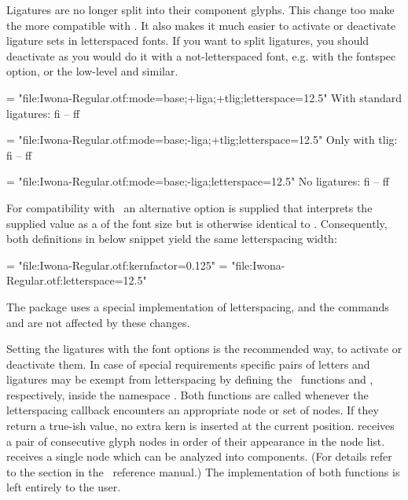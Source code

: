          Ligatures  are no longer split into their component glyphs.
         This change too make the  more compatible with
         \XeTeX. It also makes it much easier to activate or deactivate ligature sets in letterspaced fonts.
         If you want to split ligatures, you should deactivate as you would do it with a not-letterspaced font, e.g. with the fontspec  option, or the low-level  and similar.


         {\font \test = "file:Iwona-Regular.otf:mode=base;+liga;+tlig;letterspace=12.5"
          \test With standard ligatures: fi -- ff\par

          \font \test = "file:Iwona-Regular.otf:mode=base;-liga;+tlig;letterspace=12.5"
          \test Only with tlig: fi -- ff \par

          \font \test = "file:Iwona-Regular.otf:mode=base;-liga;letterspace=12.5"
          \test No ligatures: fi -- ff \par
         }

         For compatibility with \XeTeX\ an alternative
          option is supplied that interprets the
         supplied value as a  of the font size but
         is otherwise identical to .
         Consequently, both definitions in below snippet yield the same
         letterspacing width:

         \beginlisting
    \font \iwonakernedA = "file:Iwona-Regular.otf:kernfactor=0.125"
    \font \iwonakernedB = "file:Iwona-Regular.otf:letterspace=12.5"
         \endlisting

         The  package uses a special implementation of letterspacing, and the commands \inlinecode{\lsstyle} and \inlinecode{\textls} are  not affected by these changes.

         Setting the ligatures with the font options is the recommended way, to activate or deactivate them. In case of special requirements
         specific pairs of letters and ligatures may be exempt from
         letterspacing by defining the \Lua\ functions
          and ,
         respectively, inside the namespace .
         Both functions are called whenever the letterspacing callback
         encounters an appropriate node or set of nodes.
         If they return a true-ish value, no extra kern is inserted at
         the current position.
          receives a pair of consecutive
         glyph nodes in order of their appearance in the node list.
          receives a single node which can be
         analyzed into components.
         (For details refer to the  section in the
         \LuaTeX\ reference manual.)
         The implementation of both functions is left entirely to the
         user.
  \endaltitem

